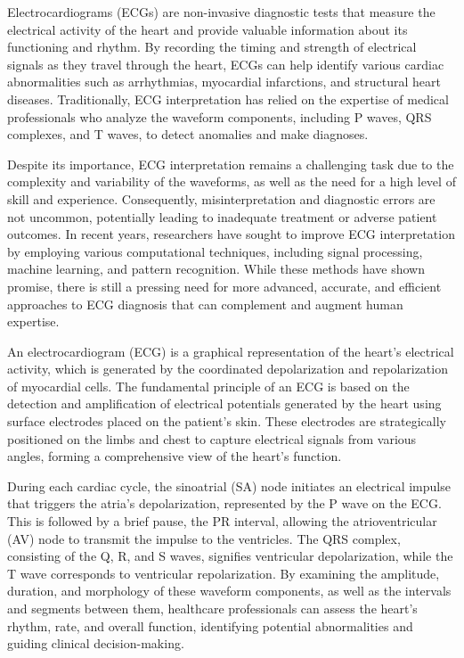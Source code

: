 \documentclass[10pt,twocolumn,letterpaper]{article}
\begin{document}
Electrocardiograms (ECGs) are non-invasive diagnostic tests that measure the electrical activity of the heart and provide valuable information about its functioning and rhythm. By recording the timing and strength of electrical signals as they travel through the heart, ECGs can help identify various cardiac abnormalities such as arrhythmias, myocardial infarctions, and structural heart diseases. Traditionally, ECG interpretation has relied on the expertise of medical professionals who analyze the waveform components, including P waves, QRS complexes, and T waves, to detect anomalies and make diagnoses.

Despite its importance, ECG interpretation remains a challenging task due to the complexity and variability of the waveforms, as well as the need for a high level of skill and experience. Consequently, misinterpretation and diagnostic errors are not uncommon, potentially leading to inadequate treatment or adverse patient outcomes. In recent years, researchers have sought to improve ECG interpretation by employing various computational techniques, including signal processing, machine learning, and pattern recognition. While these methods have shown promise, there is still a pressing need for more advanced, accurate, and efficient approaches to ECG diagnosis that can complement and augment human expertise.

An electrocardiogram (ECG) is a graphical representation of the heart's electrical activity, which is generated by the coordinated depolarization and repolarization of myocardial cells. The fundamental principle of an ECG is based on the detection and amplification of electrical potentials generated by the heart using surface electrodes placed on the patient's skin. These electrodes are strategically positioned on the limbs and chest to capture electrical signals from various angles, forming a comprehensive view of the heart's function.

During each cardiac cycle, the sinoatrial (SA) node initiates an electrical impulse that triggers the atria's depolarization, represented by the P wave on the ECG. This is followed by a brief pause, the PR interval, allowing the atrioventricular (AV) node to transmit the impulse to the ventricles. The QRS complex, consisting of the Q, R, and S waves, signifies ventricular depolarization, while the T wave corresponds to ventricular repolarization. By examining the amplitude, duration, and morphology of these waveform components, as well as the intervals and segments between them, healthcare professionals can assess the heart's rhythm, rate, and overall function, identifying potential abnormalities and guiding clinical decision-making.
\end{document}
